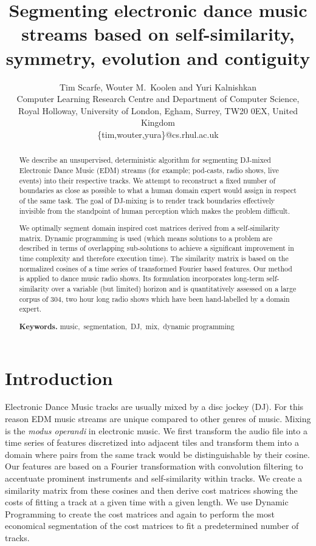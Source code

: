 \documentclass[twocolumn]{article}
\author{Tim Scarfe, Wouter M.~Koolen and Yuri Kalnishkan \\ 
	Computer Learning Research
	Centre and Department of Computer Science, \\ 
	Royal Holloway,  University of London, Egham, Surrey, TW20 0EX, United Kingdom\\
	\{tim,wouter,yura\}@cs.rhul.ac.uk
}
\title{Segmenting electronic dance music streams based on self-similarity, symmetry, evolution and contiguity}
\begin{document}
	
	\maketitle
	
	\begin{abstract}
		
		We describe an unsupervised, deterministic algorithm for segmenting DJ-mixed Electronic Dance Music (EDM) streams (for example; pod-casts, radio shows, live events) into their respective tracks. We attempt to reconstruct a fixed number of boundaries as close as possible to what a human domain expert would assign in respect of the same task. The goal of DJ-mixing is to render track boundaries effectively invisible from the standpoint of human perception which makes the problem difficult.
		
		We optimally segment domain inspired cost matrices derived from a self-similarity matrix. Dynamic programming is used (which means solutions to a problem are described in terms of overlapping sub-solutions to achieve a significant improvement in time complexity and therefore execution time). The similarity matrix is based on the normalized cosines of a time series of transformed Fourier based features. Our method is applied to dance music radio shows. Its formulation incorporates long-term self-similarity over a variable (but limited) horizon and is quantitatively assessed on a large corpus of $304$, two hour long radio shows which have been hand-labelled by a domain expert.
		\smallskip
		
		\noindent \textbf{Keywords.} \noindent music,~segmentation,~DJ,~mix,~dynamic programming
		
	\end{abstract}
	
	
	\vspace{1em}
	
	\section{Introduction}
	
	Electronic Dance Music tracks are usually mixed by a disc jockey (DJ). For this reason EDM music streams are unique compared to other genres of music. Mixing is the \textit{modus operandi} in electronic music. We first transform the audio file into a time series of features discretized into adjacent tiles and transform them into a domain where pairs from the same track would be distinguishable by their cosine. Our features are based on a Fourier transformation with convolution filtering to accentuate prominent instruments and self-similarity within tracks. We create a similarity matrix from these cosines and then derive cost matrices showing the costs of fitting a track at a given time with a given length. We use Dynamic Programming to create the cost matrices and again to perform the most economical segmentation of the cost matrices to fit a predetermined number of tracks.
	
\end{document}
